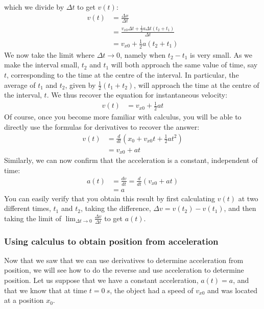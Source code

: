 which we divide by $\Delta t$ to get $v(t)$:
\begin{align*}
v(t) &= \frac{\Delta x}{\Delta t}\\
&=\frac{v_{x0}\Delta t+\frac{1}{2}a\Delta t (t_2+t_1)}{\Delta t}\\
&=v_{x0}+\frac{1}{2}a(t_2+t_1)
\end{align*}
We now take the limit where $\Delta t\to 0$, namely when $t_2-t_1$ is very small. As we make the interval small, $t_2$ and $t_1$ will both approach the same value of time, say $t$, corresponding to the time at the centre of the interval. In particular, the average of $t_1$ and $t_2$, given by $\frac{1}{2}(t_1+t_2)$, will approach the time at the centre of the interval, $t$. We thus recover the equation for instantaneous velocity:
\begin{align*}
v(t) &= v_{x0}+\frac{1}{2}at
\end{align*}
Of course, once you become more familiar with calculus, you will be able to directly use the formulas for derivatives to recover the answer:
\begin{align*}
v(t) &= \frac{d}{dt}\left( x_0+v_{x0}t+\frac{1}{2}at^2 \right) \\
     &= v_{x0}+at 
\end{align*}
Similarly, we can now confirm that the acceleration is a constant, independent of time:
\begin{align*}
a(t) &= \frac{dv}{dt} = \frac{d}{dt}\left(v_{x0}+at \right)\\
     &=a
\end{align*}
You can easily verify that you obtain this result by first calculating $v(t)$ at two different times, $t_1$ and $t_2$, taking the difference, $\Delta v = v(t_2)-v(t_1)$, and then taking the limit of $\lim_{\Delta t\to 0}\frac{\Delta v}{\Delta t}$ to get $a(t)$.

\subsubsection{Using calculus to obtain position from acceleration}
Now that we saw that we can use derivatives to determine acceleration from position, we will see how to do the reverse and use acceleration to determine position. Let us suppose that we have a constant acceleration, $a(t)=a$, and that we know that at time $t=\SI{0}{s}$, the object had a speed of $v_{x0}$ and was located at a position $x_0$. 


